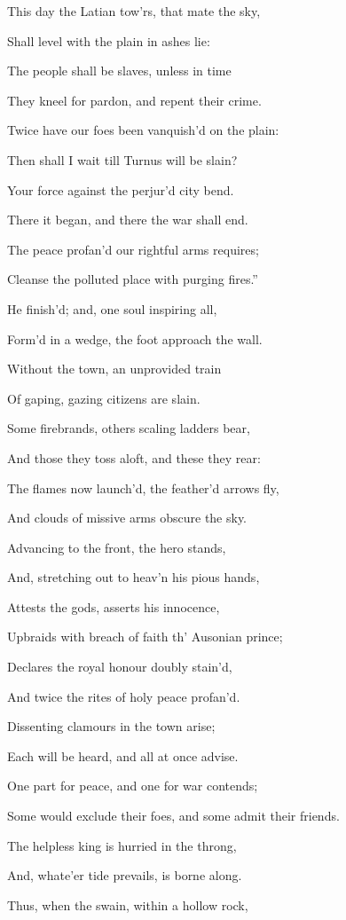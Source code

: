 This day the Latian tow’rs, that mate the sky,

Shall level with the plain in ashes lie:

The people shall be slaves, unless in time

They kneel for pardon, and repent their crime.

Twice have our foes been vanquish’d on the plain:

Then shall I wait till Turnus will be slain?

Your force against the perjur’d city bend.

There it began, and there the war shall end.

The peace profan’d our rightful arms requires;

Cleanse the polluted place with purging fires.”

He finish’d; and, one soul inspiring all,

Form’d in a wedge, the foot approach the wall.

Without the town, an unprovided train

Of gaping, gazing citizens are slain.

Some firebrands, others scaling ladders bear,

And those they toss aloft, and these they rear:

The flames now launch’d, the feather’d arrows fly,

And clouds of missive arms obscure the sky.

Advancing to the front, the hero stands,

And, stretching out to heav’n his pious hands,

Attests the gods, asserts his innocence,

Upbraids with breach of faith th’ Ausonian prince;

Declares the royal honour doubly stain’d,

And twice the rites of holy peace profan’d.

Dissenting clamours in the town arise;

Each will be heard, and all at once advise.

One part for peace, and one for war contends;

Some would exclude their foes, and some admit their friends.

The helpless king is hurried in the throng,

And, whate’er tide prevails, is borne along.

Thus, when the swain, within a hollow rock,

